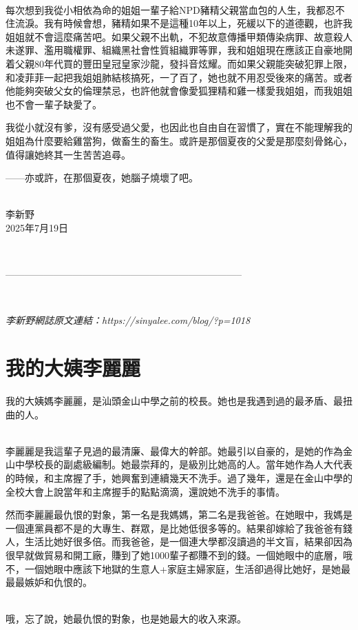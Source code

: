 \ 

每次想到我從小相依為命的姐姐一輩子給NPD豬精父親當血包的人生，我都忍不住流淚。我有時候會想，豬精如果不是這種10年以上，死緩以下的道德觀，也許我姐姐就不會這麼痛苦吧。如果父親不出軌，不犯故意傳播甲類傳染病罪、故意殺人未遂罪、濫用職權罪、組織黑社會性質組織罪等罪，我和姐姐現在應該正自豪地開着父親80年代買的豐田皇冠皇家沙龍，發抖音炫耀。而如果父親能突破犯罪上限，和凌菲菲一起把我姐姐肺結核搞死，一了百了，她也就不用忍受後來的痛苦。或者他能夠突破父女的倫理禁忌，也許他就會像愛狐狸精和雞一樣愛我姐姐，而我姐姐也不會一輩子缺愛了。

我從小就沒有爹，沒有感受過父愛，也因此也自由自在習慣了，實在不能理解我的姐姐為什麼要給雞當狗，做畜生的畜生。或許是那個夏夜的父愛是那麼刻骨銘心，值得讓她終其一生苦苦追尋。

——亦或許，在那個夏夜，她腦子燒壞了吧。

\ \\
李新野\\
2025年7月19日

\ 

--------------------------------------------------------------------------

\

\textit{李新野網誌原文連結：https://sinyalee.com/blog/?p=1018}

\newpage

\section{我的大姨李麗麗}
\label{aunt}
我的大姨媽李麗麗，是汕頭金山中學之前的校長。她也是我遇到過的最矛盾、最扭曲的人。

\ \\
李麗麗是我這輩子見過的最清廉、最偉大的幹部。她最引以自豪的，是她的作為金山中學校長的副處級編制。她最崇拜的，是級別比她高的人。當年她作為人大代表的時候，和主席握了手，她興奮到連續幾天不洗手。過了幾年，還是在金山中學的全校大會上說當年和主席握手的點點滴滴，還說她不洗手的事情。

然而李麗麗最仇恨的對象，第一名是我媽媽，第二名是我爸爸。在她眼中，我媽是一個連黨員都不是的大專生、群眾，是比她低很多等的。結果卻嫁給了我爸爸有錢人，生活比她好很多倍。而我爸爸，是一個連大學都沒讀過的半文盲，結果卻因為很早就做貿易和開工廠，賺到了她1000輩子都賺不到的錢。一個她眼中的底層，哦不，一個她眼中應該下地獄的生意人+家庭主婦家庭，生活卻過得比她好，是她最最最嫉妒和仇恨的。

\ \\
哦，忘了說，她最仇恨的對象，也是她最大的收入來源。

